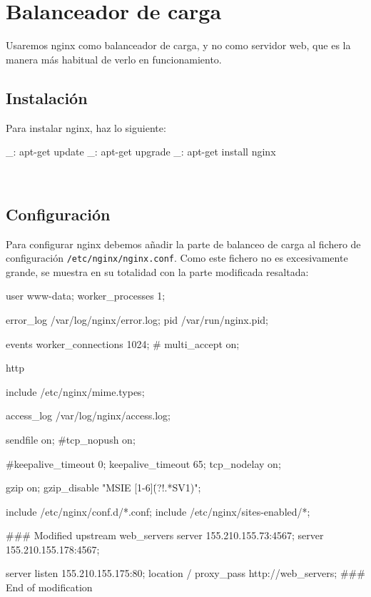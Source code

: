 \chapter{Balanceador de carga}
\label{web:balanceador}

Usaremos nginx como balanceador de carga, y no como servidor web, que es la manera más habitual de verlo en funcionamiento.


\section{Instalación}

Para instalar nginx, haz lo siguiente:

\begin{bashcode}
_: apt-get update
_: apt-get upgrade
_: apt-get install nginx
\end{bashcode}
\\


\section{Configuración}

Para configurar nginx debemos añadir la parte de balanceo de carga al fichero de configuración \texttt{/etc/nginx/nginx.conf}. Como este fichero no es excesivamente grande, se muestra en su totalidad con la parte modificada resaltada:

\begin{bashcode}
user www-data;
worker_processes  1;

error_log  /var/log/nginx/error.log;
pid        /var/run/nginx.pid;

events {
    worker_connections  1024;
    # multi_accept on;
}

http {
    include       /etc/nginx/mime.types;

    access_log	/var/log/nginx/access.log;

    sendfile        on;
    #tcp_nopush     on;

    #keepalive_timeout  0;
    keepalive_timeout  65;
    tcp_nodelay        on;

    gzip  on;
    gzip_disable "MSIE [1-6]\.(?!.*SV1)";

    include /etc/nginx/conf.d/*.conf;
    include /etc/nginx/sites-enabled/*;


    ### Modified
    upstream web_servers {
      server 155.210.155.73:4567;
      server 155.210.155.178:4567;
    }

    server {
      listen 155.210.155.175:80;
      location / {
        proxy_pass http://web_servers;
      }
    }
    ### End of modification


}
\end{bashcode}
\\


